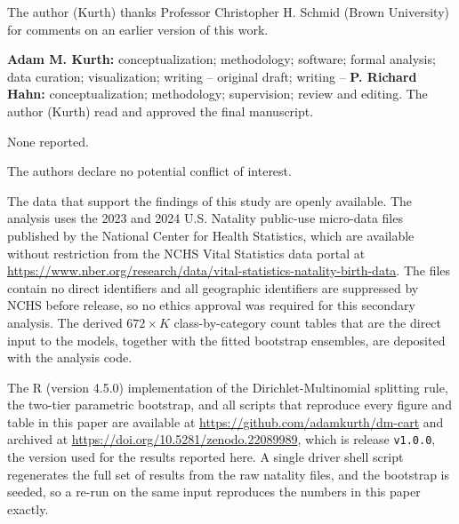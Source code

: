 \documentclass[AMA]{USG}
\begin{document}

The author (Kurth) thanks Professor Christopher H. Schmid (Brown University) for comments on an earlier version of this work.

\textbf{Adam M. Kurth:} conceptualization; methodology; software; formal
analysis; data curation; visualization; writing -- original draft; writing --
\textbf{P. Richard Hahn:} conceptualization; methodology; supervision;
review and editing.
The author (Kurth) read and approved the final manuscript.

None reported.

The authors declare no potential conflict of interest.

The data that support the findings of this study are openly available. The
analysis uses the 2023 and 2024 U.S. Natality public-use micro-data files
published by the National Center for Health Statistics, which are available
without restriction from the NCHS Vital Statistics data portal at
\url{https://www.nber.org/research/data/vital-statistics-natality-birth-data}. The files contain no direct identifiers and all geographic identifiers are suppressed by
NCHS before release, so no ethics approval was required for this secondary
analysis. The derived $672 \times K$ class-by-category count tables that are
the direct input to the models, together with the fitted bootstrap ensembles,
are deposited with the analysis code.

The R (version 4.5.0) implementation of the Dirichlet-Multinomial splitting rule, the two-tier parametric bootstrap, and all scripts that reproduce every figure and table in this paper are available at \url{https://github.com/adamkurth/dm-cart} and archived at \url{https://doi.org/10.5281/zenodo.22089989}, which is release \texttt{v1.0.0}, the version used for the results reported here. A single driver shell script regenerates the full set of results from the raw natality files, and the bootstrap is seeded, so a re-run on the same input reproduces the numbers in this paper exactly.


\end{document}
